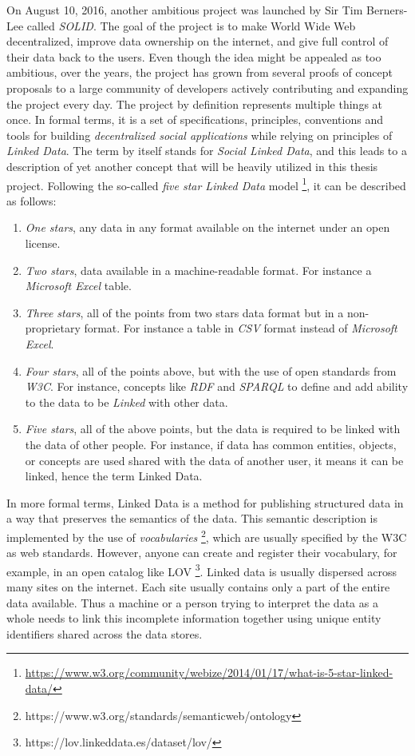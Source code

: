 On August 10, 2016, another ambitious project was launched by Sir Tim Berners-Lee called \textit{SOLID}. The goal of the project is to make World Wide Web decentralized, improve data ownership on the internet, and give full control of their data back to the users. Even though the idea might be appealed as too ambitious, over the years, the project has grown from several proofs of concept proposals to a large community of developers actively contributing and expanding the project every day. The \solid{} project by definition represents multiple things at once. In formal terms, it is a set of specifications, principles, conventions and tools for building \textit{decentralized social applications} while relying on principles of \textit{Linked Data}. The term \solid{} by itself stands for \textit{Social Linked Data}, and this leads to a description of yet another concept that will be heavily utilized in this thesis project. Following the so-called \textit{five star Linked Data} model \footnote{\url{https://www.w3.org/community/webize/2014/01/17/what-is-5-star-linked-data/}}, it can be described as follows:
\begin{enumerate}
    \item \textit{One stars}, any data in any format available on the internet under an open license.
    \item \textit{Two stars}, data available in a machine-readable format. For instance a \textit{Microsoft Excel} table.
    \item \textit{Three stars}, all of the points from two stars data format but in a non-proprietary format. For instance a table in \textit{CSV} format instead of \textit{Microsoft Excel}.
    \item \textit{Four stars}, all of the points above, but with the use of open standards from \textit{W3C}. For instance, concepts like \textit{RDF} and \textit{SPARQL} to define and add ability to the data to be \textit{Linked} with other data.
    \item \textit{Five stars}, all of the above points, but the data is required to be linked with the data of other people. For instance, if data has common entities, objects, or concepts are used shared with the data of another user, it means it can be linked, hence the term Linked Data.   
\end{enumerate}

In more formal terms, Linked Data is a method for publishing structured data in a way that preserves the semantics of the data. This semantic description is implemented by the use of \textit{vocabularies} \footnote{https://www.w3.org/standards/semanticweb/ontology}, which are usually specified by the \acrshort{W3C} as web standards. However, anyone can create and register their vocabulary, for example, in an open catalog like \acrshort{LOV} \footnote{https://lov.linkeddata.es/dataset/lov/}. Linked data is usually dispersed across many sites on the internet. Each site usually contains only a part of the entire data available. Thus a machine or a person trying to interpret the data as a whole needs to link this incomplete information together using unique entity identifiers shared across the data stores.

